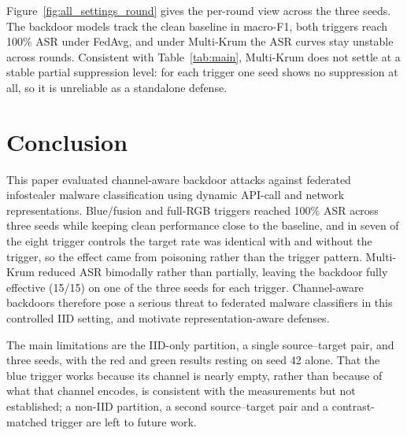 \documentclass[conference]{IEEEtran}
\begin{document}
Figure~\ref{fig:all_settings_round} gives the per-round view across the three seeds. The backdoor models track the clean baseline in macro-F1, both triggers reach 100\% ASR under FedAvg, and under Multi-Krum the ASR curves stay unstable across rounds. Consistent with Table~\ref{tab:main}, Multi-Krum does not settle at a stable partial suppression level: for each trigger one seed shows no suppression at all, so it is unreliable as a standalone defense.

\section{Conclusion}

This paper evaluated channel-aware backdoor attacks against federated infostealer malware classification using dynamic API-call and network representations. Blue/fusion and full-RGB triggers reached 100\% ASR across three seeds while keeping clean performance close to the baseline, and in seven of the eight trigger controls the target rate was identical with and without the trigger, so the effect came from poisoning rather than the trigger pattern. Multi-Krum reduced ASR bimodally rather than partially, leaving the backdoor fully effective (15/15) on one of the three seeds for each trigger. Channel-aware backdoors therefore pose a serious threat to federated malware classifiers in this controlled IID setting, and motivate representation-aware defenses.

The main limitations are the IID-only partition, a single source--target pair, and three seeds, with the red and green results resting on seed 42 alone. That the blue trigger works because its channel is nearly empty, rather than because of what that channel encodes, is consistent with the measurements but not established; a non-IID partition, a second source--target pair and a contrast-matched trigger are left to future work.
\end{document}
